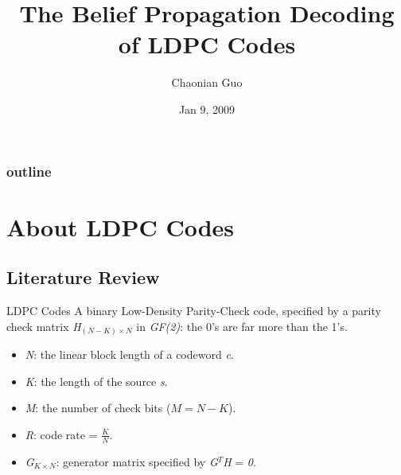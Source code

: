 \def\CTeXPreproc{Created by ctex v0.2.12, don't edit!}\documentclass{beamer}
\title[]
{The Belief Propagation Decoding of LDPC Codes}
\author[]
{Chaonian Guo}
\date
{Jan 9, 2009}
\newcommand{\xieti}{\textsl}
\begin{document}
\begin{frame}
  \titlepage
\end{frame}

\begin{frame}
  \frametitle{outline}
  \tableofcontents
\end{frame}

\section{About LDPC Codes}

\subsection{Literature Review}
\begin{frame}
    \begin{block}{LDPC Codes}
        A binary Low-Density Parity-Check code, specified by a parity check matrix
        \xieti{H$_{(N-K)\times N}$} in \xieti{GF(2)}: the 0's are far more than the 1's.
        \begin{itemize}
            \item \xieti{N}: the linear block length of a codeword \xieti{c}.
            \item \xieti{K}: the length of the source \xieti{s}.
            \item \xieti{M}: the number of check bits ($M = N-K$).
            \item \xieti{R}: code rate = $\frac{K}{N}$.
            \item \xieti{G$_{K\times N}$}: generator matrix specified by \xieti{G$^T$H} = \xieti{0}.
        \end{itemize}
    \end{block}
\end{frame}
\end{document}
